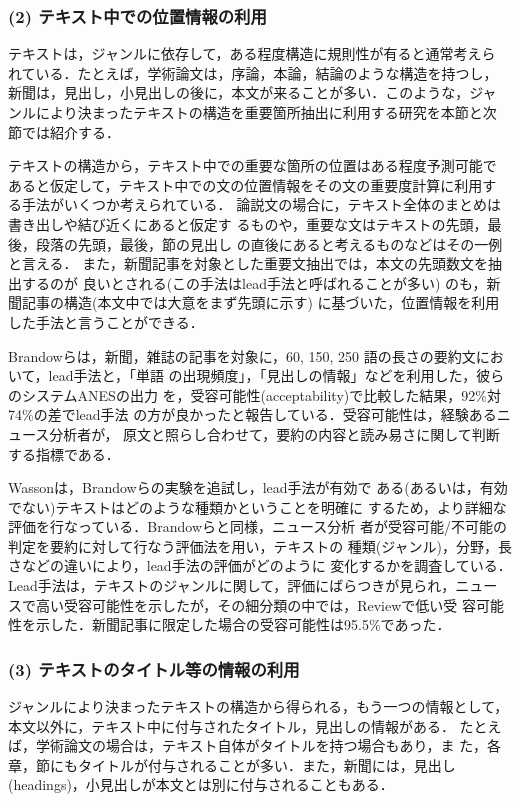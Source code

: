 \subsubsection{(2) テキスト中での位置情報の利用}

テキストは，ジャンルに依存して，ある程度構造に規則性が有ると通常考えら 
れている．たとえば，学術論文は，序論，本論，結論のような構造を持つし，
新聞は，見出し，小見出しの後に，本文が来ることが多い．このような，ジャ
ンルにより決まったテキストの構造を重要箇所抽出に利用する研究を本節と次
節では紹介する．

テキストの構造から，テキスト中での重要な箇所の位置はある程度予測可能で
あると仮定して，テキスト中での文の位置情報をその文の重要度計算に利用す
る手法がいくつか考えられている．
論説文の場合に，テキスト全体のまとめは書き出しや結び近くにあると仮定す
るものや，重要な文はテキストの先頭，最後，段落の先頭，最後，節の見出し
の直後にあると考える\cite{edmundson:69:a}ものなどはその一例と言える．
また，新聞記事を対象とした重要文抽出では，本文の先頭数文を抽出するのが
良いとされる(この手法はlead手法と呼ばれることが多い)
\cite{brandow:95:a}のも，新聞記事の構造(本文中では大意をまず先頭に示す)
に基づいた，位置情報を利用した手法と言うことができる．

Brandowら\cite{brandow:95:a}は，新聞，雑誌の記事を対象に，60, 150, 250
語の長さの要約文において，lead手法と，「単語
の出現頻度」，「見出しの情報」などを利用した，彼らのシステムANESの出力
を，受容可能性(acceptability)で比較した結果，92\%対74\%の差でlead手法
の方が良かったと報告している．受容可能性は，経験あるニュース分析者が，
原文と照らし合わせて，要約の内容と読み易さに関して判断する指標である．

Wasson\cite{wasson:98:a}は，Brandowらの実験を追試し，lead手法が有効で
ある(あるいは，有効でない)テキストはどのような種類かということを明確に
するため，より詳細な評価を行なっている．Brandowらと同様，ニュース分析
者が受容可能/不可能の判定を要約に対して行なう評価法を用い，テキストの
種類(ジャンル)，分野，長さなどの違いにより，lead手法の評価がどのように
変化するかを調査している．
Lead手法は，テキストのジャンルに関して，評価にばらつきが見られ，ニュー
スで高い受容可能性を示したが，その細分類の中では，Reviewで低い受
容可能性を示した．新聞記事に限定した場合の受容可能性は95.5\%であった．

\subsubsection{(3) テキストのタイトル等の情報の利用}

ジャンルにより決まったテキストの構造から得られる，もう一つの情報として，
本文以外に，テキスト中に付与されたタイトル，見出しの情報がある．
たとえば，学術論文の場合は，テキスト自体がタイトルを持つ場合もあり，ま
た，各章，節にもタイトルが付与されることが多い．また，新聞には，見出し
(headings)，小見出しが本文とは別に付与されることもある．

